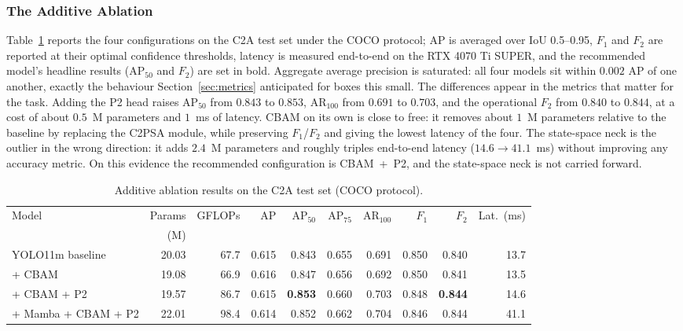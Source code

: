 \subsubsection{The Additive Ablation}
Table~\ref{tab:main} reports the four configurations on the C2A test set
under the COCO protocol; AP is averaged over IoU 0.5--0.95, $F_1$ and $F_2$
are reported at their optimal confidence thresholds, latency is measured
end-to-end on the RTX 4070 Ti SUPER, and the recommended model's headline
results ($\mathrm{AP}_{50}$ and $F_2$) are set in bold. Aggregate average
precision is saturated: all
four models sit within $0.002$ AP of one another, exactly the behaviour
Section~\ref{sec:metrics} anticipated for boxes this small. The differences
appear in the metrics that matter for the task. Adding the P2 head raises
$\mathrm{AP}_{50}$ from $0.843$ to $0.853$, $\mathrm{AR}_{100}$ from $0.691$
to $0.703$, and the operational $F_2$ from $0.840$ to $0.844$, at a cost of
about $0.5$~M parameters and $1$~ms of latency. CBAM on its own is close to
free: it removes about $1$~M parameters relative to the baseline by replacing
the C2PSA module, while preserving $F_1$/$F_2$ and giving the lowest latency
of the four. The state-space neck
is the outlier in the wrong direction: it adds $2.4$~M parameters and
roughly triples end-to-end latency ($14.6 \to 41.1$~ms) without improving
any accuracy metric. On this evidence the recommended configuration is
CBAM~+~P2, and the state-space neck is not carried forward.

\begin{table}[tbp]
  \centering
  \caption{Additive ablation results on the C2A test set (COCO protocol).}
  \label{tab:main}
  \small
  \setlength{\tabcolsep}{3pt}
  \begin{tabular}{@{}l r r r r r r r r r@{}}
    \toprule
    Model & Params & GFLOPs & AP & $\mathrm{AP}_{50}$ & $\mathrm{AP}_{75}$ & $\mathrm{AR}_{100}$ & $F_1$ & $F_2$ & Lat.\ (ms) \\
    & (M) & & & & & & & & \\
    \midrule
    YOLO11m baseline    & 20.03 & 67.7 & 0.615 & 0.843 & 0.655 & 0.691 & 0.850 & 0.840 & 13.7 \\
    + CBAM              & 19.08 & 66.9 & 0.616 & 0.847 & 0.656 & 0.692 & 0.850 & 0.841 & 13.5 \\
    + CBAM + P2         & 19.57 & 86.7 & 0.615 & \textbf{0.853} & 0.660 & 0.703 & 0.848 & \textbf{0.844} & 14.6 \\
    + Mamba + CBAM + P2 & 22.01 & 98.4 & 0.614 & 0.852 & 0.662 & 0.704 & 0.846 & 0.844 & 41.1 \\
    \bottomrule
  \end{tabular}
\end{table}

